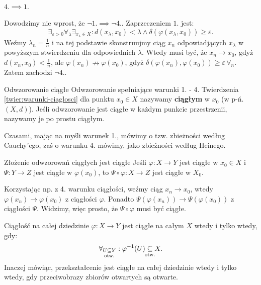 \documentclass{article}
\numberwithin{defi}{section}
\numberwithin{defi}{section}
\newcommand{\subotw}{\underset{\clap{\scriptsize otw.}}{\subseteq}}
\providecommand{\eps}{\varepsilon}
\begin{document}
\begin{dow}
    \paragraph{$4. \implies 1.$} Dowodzimy nie wprost, że $\neg 1. \implies \neg 4.$. Zaprzeczeniem $1.$ jest: \begin{equation*}
        \exists_{\eps > 0} \forall_\lambda \exists_{x_\lambda \in X}: d(x_\lambda, x_0) < \lambda \wedge \delta( \varphi(x_\lambda, x_0)) \geqslant \eps.
    \end{equation*} Weźmy $\lambda_n = \frac{1}{n}$ i na tej podstawie skonstruujmy ciąg $x_n$ odpowiadjących $x_\lambda$ w powyższym stwierdzeniu dla odpowiednich $\lambda$. Wtedy musi być, że $x_n \to x_0$, gdyż $d(x_n, x_0) < \frac{1}{n}$, ale $\varphi(x_n) \nrightarrow \varphi(x_0)$, gdyż $\delta( \varphi(x_n), \varphi(x_0)) \geqslant \eps \, \forall_n$. Zatem zachodzi $\neg 4.$.

\end{dow}


    \begin{defr}{Odwzorowanie ciągłe}\label{defr:ciaglosc}
        Odwzorowanie spełniające warunki 1. - 4. Twierdzenia \ref{twier:warunki-ciaglosci} dla punktu $x_0 \in X$ nazywamy \textbf{ciągłym} w $x_0$ (w p-ń. $(X, d)$). Jeśli odwzorowanie jest ciągłe w każdym punkcie przestrzenii, nazywamy je po prostu ciągłym.
    \end{defr}
        Czasami, mając na myśli warunek 1., mówimy o tzw. zbieżności według Cauchy'ego, zaś o warunku 4. mówimy, jako zbieżności według Heinego.

    \begin{twier}{Złożenie odwzorowań ciągłych jest ciągłe}
        Jeśli $\varphi: X \to Y$ jest ciągłe w $x_0 \in X$ i $\Psi: Y \to Z$ jest ciągłe w $\varphi(x_0)$, to $\Psi \circ \varphi: X \to Z$ jest ciągłe w $X_0$.
    \end{twier}

    \begin{dow}
        Korzystając np. z 4. warunku ciągłości, weźmy ciąg $x_n \to x_0$, wtedy $\varphi(x_n) \to \varphi(x_0)$ z ciągłości $\varphi$. Ponadto $\Psi(\varphi(x_n)) \to \Psi(\varphi(x_0))$ z ciągłości $\Psi$. Widzimy, więc prosto, że $\Psi \circ \varphi$ musi być ciągłe.
    \end{dow}

    \begin{twier}{Ciągłość na całej dziedzinie}
        $\varphi: X \to Y$ jest ciągłe na całym $X$ wtedy i tylko wtedy, gdy: \begin{equation}
            \forall_{U \subotw Y}: \varphi^{-1}(U) \subotw X.
        \end{equation} Inaczej mówiąc, przekształcenie jest ciągłe na całej dziedzinie wtedy i tylko wtedy, gdy przeciwobrazy zbiorów otwartych są otwarte.
    \end{twier}
\end{document}
